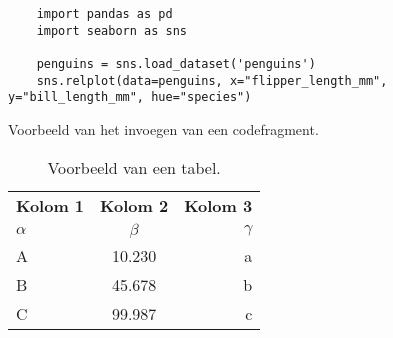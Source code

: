 \begin{listing}
  \begin{verbatim}
    import pandas as pd
    import seaborn as sns

    penguins = sns.load_dataset('penguins')
    sns.relplot(data=penguins, x="flipper_length_mm", y="bill_length_mm", hue="species")
  \end{verbatim}
  \caption[Voorbeeld codefragment]{Voorbeeld van het invoegen van een codefragment.}
\end{listing}

\lipsum[7-20]

\begin{table}
  \centering
  \begin{tabular}{lcr}
    \toprule
    \textbf{Kolom 1} & \textbf{Kolom 2} & \textbf{Kolom 3} \\
    $\alpha$         & $\beta$          & $\gamma$         \\
    \midrule
    A                & 10.230           & a                \\
    B                & 45.678           & b                \\
    C                & 99.987           & c                \\
    \bottomrule
  \end{tabular}
  \caption[Voorbeeld tabel]{\label{tab:example}Voorbeeld van een tabel.}
\end{table}

